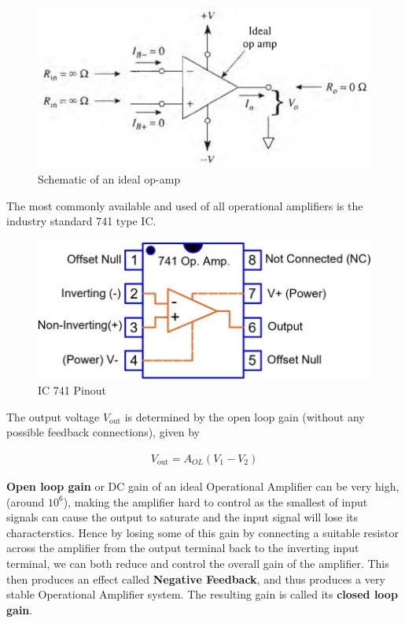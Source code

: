 \begin{figure}[H]
    \centering
    \includegraphics[width=0.9\columnwidth]{images/ideal.png}
    \caption{Schematic of an ideal op-amp}
    \label{fig:0}
\end{figure}

The most commonly available and used of all operational amplifiers is the industry standard 741 type IC. 

\begin{figure}[H]
    \centering
    \includegraphics[width=0.8\columnwidth]{images/pinout.jpeg}
    \caption{IC 741 Pinout}
    \label{fig:1}
\end{figure}

The output voltage $V_\text{out}$ is determined by the open loop gain (without any possible feedback connections), given by 

\begin{align}V_\text{out}=A_{OL}(V_1-V_2)\end{align} 

\textbf{Open loop gain} or DC gain of an ideal Operational Amplifier can be very high, (around $10^6$), making the amplifier hard to control as the smallest of input signals can cause the output to saturate and the input signal will lose its characterstics. Hence by losing some of this gain by connecting a suitable resistor across the amplifier from the output terminal back to the inverting input terminal, we can both reduce and control the overall gain of the amplifier. This then produces an effect called \textbf{Negative Feedback}, and thus produces a very stable Operational Amplifier system. The resulting gain is called its \textbf{closed loop gain}.



